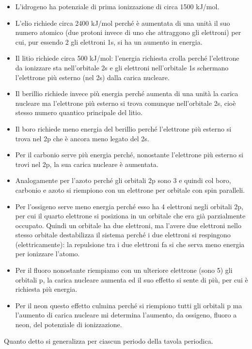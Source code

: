 \begin{itemize}
    \item L'idrogeno ha potenziale di prima ionizzazione di circa 1500  kJ/mol.
    \item L'elio richiede circa 2400 kJ/mol perché è aumentata di una unità il suo numero atomico (due protoni invece di uno che attraggono gli elettroni) per cui, pur essendo 2 gli elettroni 1s, si ha un aumento in energia.
    \item Il litio richiede circa 500 kJ/mol: l'energia richiesta crolla perché l'elettrone da ionizzare sta nell'orbitale 2s e gli elettroni nell'orbitale 1s schermano l'elettrone più esterno (nel 2s) dalla carica nucleare.
    \item Il berillio richiede invece più energia perché aumenta di una unità la carica nucleare ma l'elettrone più esterno si trova comunque nell'orbitale 2s, cioè stesso numero quantico principale del litio. 
    \item Il boro richiede meno energia del berillio perché l'elettrone più esterno si trova nel 2p che è ancora meno legato del 2s.
    \item Per il carbonio serve più energia perché, nonostante l'elettrone più esterno si trovi nel 2p, la sua carica nucleare è aumentata.
    \item Analogamente per l'azoto perché gli orbitali 2p sono 3 e quindi col boro, carbonio e azoto si riempiono con un elettrone per orbitale con spin paralleli.
    \item Per l'ossigeno serve meno energia perché esso ha 4 elettroni negli orbitali 2p, per cui il quarto elettrone si posiziona in un orbitale che era già parzialmente occupato. Quindi un orbitale ha due elettroni, ma l'avere due elettroni nello stesso orbitale destabilizza il sistema perché i due elettroni si respingono (elettricamente): la repulsione tra i due elettroni fa si che serva meno energia per ionizzare l'atomo.
    \item Per il fluoro nonostante riempiamo con un ulteriore elettrone (sono 5) gli orbitali p, la carica nucleare aumenta ed il suo effetto si sente di più, per cui è richiesta più energia.
    \item Per il neon questo effetto culmina perché si riempiono tutti gli orbitali p ma l'aumento di carica nucleare mi determina l'aumento, da ossigeno, fluoro a neon, del potenziale di ionizzazione.
\end{itemize}
Quanto detto si generalizza per ciascun periodo della tavola periodica.
